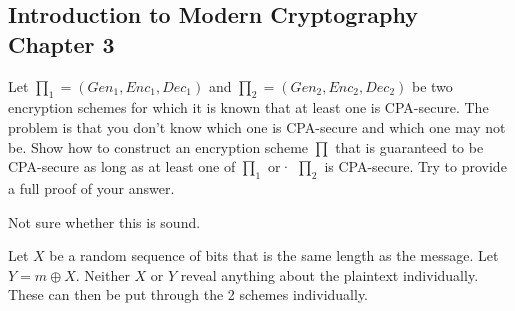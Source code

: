 \documentclass{supervision}
\begin{document}
\begin{questions}
    \section*{Introduction to Modern Cryptography Chapter 3}
    \question Let $\prod_1 = ({Gen}_1, {Enc}_1, {Dec}_1)$ and $\prod_2 =
      ({Gen}_2, {Enc}_2, {Dec}_2)$ be two encryption schemes for which it is
      known that at least one is CPA-secure. The problem is that you don't know
      which one is CPA-secure and which one may not be. Show how to construct an
      encryption scheme $\prod$ that is guaranteed to be CPA-secure as long as
      at least one of $\prod_1$ or· $\prod_2$ is CPA-secure. Try to provide a
      full proof of your answer.


      \begin{solution}
        Not sure whether this is sound.

        Let $X$ be a random sequence of bits that is the same length as the
        message. Let $Y = m \oplus X$. Neither $X$ or $Y$ reveal anything about
        the plaintext individually. These can then be put through the 2 schemes
        individually. 
      \end{solution}

  \end{questions}
\end{document}
